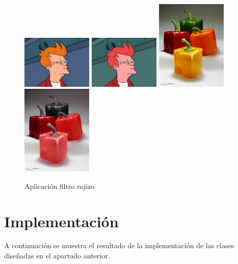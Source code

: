 \begin{figure}[H]
 \centering
 \includegraphics[width=0.3\textwidth]{imagenes/Fry.jpg}
  \includegraphics[width=0.3\textwidth]{imagenes/fryRojido.jpg}
  \vskip0.3cm
  \includegraphics[width=0.3\textwidth]{imagenes/pimientos.jpg}
  \includegraphics[width=0.3\textwidth]{imagenes/pimientoRojizo.jpg}
 \caption{Aplicación filtro rojizo}
 \label{diseño}
 \end{figure}
\clearpage
\section{Implementación}
A continuación se muestra el resultado de la implementación de las clases diseñadas en el apartado anterior.
